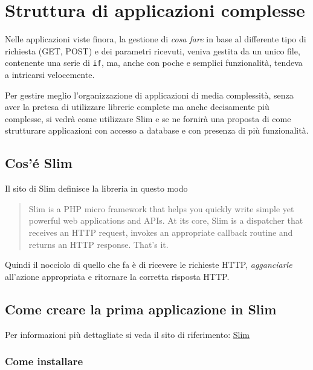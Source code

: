 \hypertarget{struttura-di-applicazioni-complesse}{%
\section{Struttura di applicazioni
complesse}\label{struttura-di-applicazioni-complesse}}

Nelle applicazioni viste finora, la gestione di \emph{cosa fare} in base
al differente tipo di richiesta (GET, POST) e dei parametri ricevuti,
veniva gestita da un unico file, contenente una serie di \texttt{if},
ma, anche con poche e semplici funzionalità, tendeva a intricarsi
velocemente.

Per gestire meglio l'organizzazione di applicazioni di media
complessità, senza aver la pretesa di utilizzare librerie complete ma
anche decisamente più complesse, si vedrà come utilizzare Slim e se ne
fornirà una proposta di come strutturare applicazioni con accesso a
database e con presenza di più funzionalità.

\hypertarget{cosuxe9-slim}{%
\subsection{Cos'é Slim}\label{cosuxe9-slim}}

Il sito di Slim definisce la libreria in questo modo

\begin{quote}
Slim is a PHP micro framework that helps you quickly write simple yet
powerful web applications and APIs. At its core, Slim is a dispatcher
that receives an HTTP request, invokes an appropriate callback routine
and returns an HTTP response. That's it.
\end{quote}

Quindi il nocciolo di quello che fa è di ricevere le richieste HTTP,
\emph{agganciarle} all'azione appropriata e ritornare la corretta
risposta HTTP.

\hypertarget{come-creare-la-prima-applicazione-in-slim}{%
\subsection{Come creare la prima applicazione in
Slim}\label{come-creare-la-prima-applicazione-in-slim}}

Per informazioni più dettagliate si veda il sito di riferimento:
\href{https://www.slimframework.com/docs/v4/}{Slim}

\hypertarget{come-installare}{%
\subsubsection{Come installare}\label{come-installare}}

